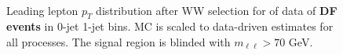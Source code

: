 \begin{figure}[!hbtp]
\centering
{}
\\
\caption{Leading lepton $p_T$ distribution after WW selection for \intlumiEightTeV of data 
of {\bf DF events} in 0-jet  1-jet  bins.  
MC is scaled to data-driven estimates for all processes.
The signal region is blinded with $m_{\ell\ell}>70$ GeV. }
\label{fig:ww_ptmax}
\end{figure}

